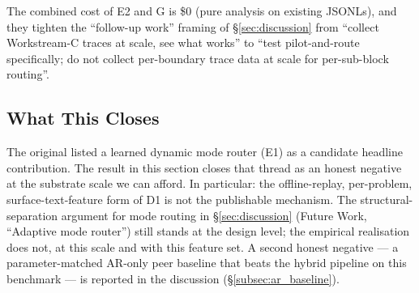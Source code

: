 The combined cost of E2 and G is \$0 (pure analysis on existing
JSONLs), and they tighten the ``follow-up work'' framing of
\S\ref{sec:discussion} from ``collect Workstream-C traces at
scale, see what works'' to ``test pilot-and-route specifically;
do not collect per-boundary trace data at scale for per-sub-block
routing''.

\subsection{What This Closes}
\label{subsec:mode_router_closes}

The original  listed a learned dynamic mode
router (E1) as a candidate headline contribution.  The result in
this section closes that thread as an honest negative at the
substrate scale we can afford.  In particular: the offline-replay,
per-problem, surface-text-feature form of D1 is not the
publishable mechanism.  The structural-separation argument for
mode routing in \S\ref{sec:discussion} (Future Work, ``Adaptive
mode router'') still stands at the design level; the empirical
realisation does not, at this scale and with this feature set.
A second honest negative --- a parameter-matched AR-only peer
baseline that beats the hybrid pipeline on this benchmark --- is
reported in the discussion (\S\ref{subsec:ar_baseline}).
